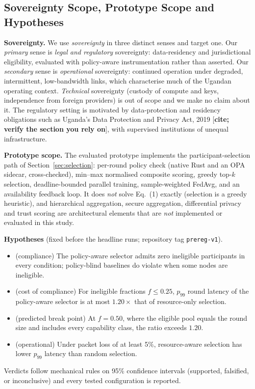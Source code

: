 \subsection{Sovereignty Scope, Prototype Scope and Hypotheses}
\label{sec:scope}
\textbf{Sovereignty.} We use \emph{sovereignty} in three distinct senses and target one. Our
\emph{primary} sense is \emph{legal and regulatory} sovereignty: data-residency and jurisdictional
eligibility, evaluated with policy-aware instrumentation rather than asserted. Our \emph{secondary} sense is
\emph{operational} sovereignty: continued operation under degraded, intermittent, low-bandwidth links, which
characterise much of the Ugandan operating context. \emph{Technical} sovereignty (custody of compute and keys,
independence from foreign providers) is out of scope and we make no claim about it. The regulatory setting is
motivated by data-protection and residency obligations such as Uganda's Data Protection and Privacy Act, 2019
[\textbf{cite; verify the section you rely on}], with supervised institutions of unequal infrastructure.

\textbf{Prototype scope.} The evaluated prototype implements the participant-selection path of
Section~\ref{sec:selection}: per-round policy check (native Rust and an OPA sidecar, cross-checked),
min--max normalised composite scoring, greedy top-$k$ selection, deadline-bounded parallel training,
sample-weighted FedAvg, and an availability feedback loop. It does \emph{not} solve Eq.~(1) exactly (selection is a
greedy heuristic), and hierarchical aggregation, secure aggregation, differential privacy and trust scoring
are architectural elements that are \emph{not} implemented or evaluated in this study.

\textbf{Hypotheses} (fixed before the headline runs; repository tag \texttt{prereg-v1}).
\begin{itemize}
\item[\textbf{H1}] (compliance) The policy-aware selector admits zero ineligible participants in every condition; policy-blind baselines do violate when some nodes are ineligible.
\item[\textbf{H2}] (cost of compliance) For ineligible fractions $f\le 0.25$, $p_{99}$ round latency of the policy-aware selector is at most $1.20\times$ that of resource-only selection.
\item[\textbf{H2b}] (predicted break point) At $f=0.50$, where the eligible pool equals the round size and includes every capability class, the ratio exceeds $1.20$.
\item[\textbf{H3}] (operational) Under packet loss of at least 5\%, resource-aware selection has lower $p_{99}$ latency than random selection.
\end{itemize}
Verdicts follow mechanical rules on 95\% confidence intervals (supported, falsified, or inconclusive) and every tested configuration is reported.
